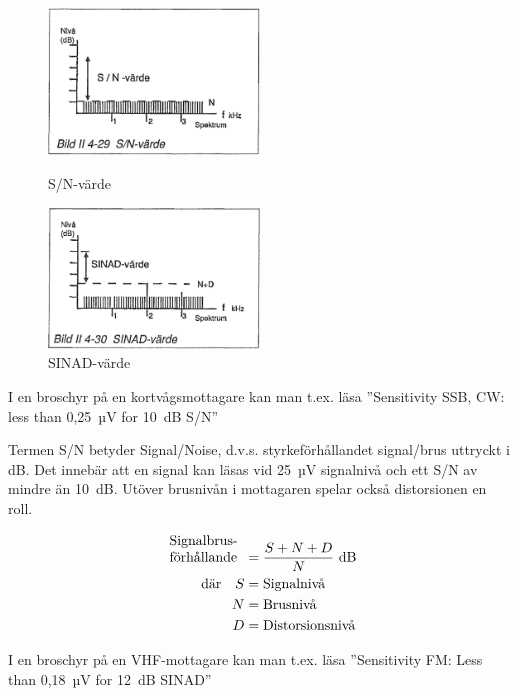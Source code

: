 \begin{figure}
  \includegraphics[width=0.5\textwidth]{images/bild_2_4-29}
  \caption{S/N-värde}
  \label{fig:bildII4-29}

  \includegraphics[width=0.5\textwidth]{images/bild_2_4-30}
  \caption{SINAD-värde}
  \label{fig:bildII4-30}
\end{figure}

I en broschyr på en kortvågsmottagare kan man t.ex. läsa
''Sensitivity SSB, CW: less than 0,25~µV for 10~dB S/N''

Termen S/N betyder Signal/Noise, d.v.s. styrkeförhållandet signal/brus
uttryckt i dB. Det innebär att en signal kan läsas vid 25~µV signalnivå
och ett S/N av mindre än 10~dB.
Utöver brusnivån i mottagaren spelar också distorsionen en roll.

\begin{align*}
  \begin{array}[b]{l}
    \text{Signalbrus-} \\
    \text{förhållande}
  \end{array} &= \frac{S + N + D}{N} \text{ dB} \\
  \text{där} \quad S &= \text{Signalnivå} \\
  N &= \text{Brusnivå} \\
  D &= \text{Distorsionsnivå} \\
\end{align*}

I en broschyr på en VHF-mottagare kan man t.ex. läsa
''Sensitivity FM: Less than 0,18~µV for 12~dB SINAD''


